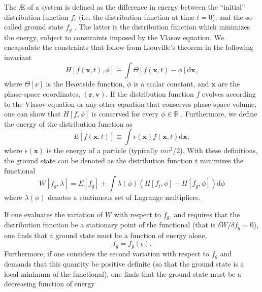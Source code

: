     \par
    The \AE{} of a system is defined as the difference in energy between the ``initial'' distribution function $f_i$ (i.e. the distribution function at time $t=0$), and the so-called ground state $f_g$ \citep{Lorenz1955AvailableCirculation,Gardner1963BoundPlasma}. The latter is the distribution function which minimizes the energy, subject to constraints imposed by the Vlasov equation. We encapsulate the constraints that follow from Liouville's theorem in the following invariant
    \begin{equation}
    H[f(\boldsymbol{x},t),\phi] \equiv \int \Theta[f(\boldsymbol{x},t)-\phi] \mathrm{d} \boldsymbol{x},
    \label{eq:vlasov-invariant}
    \end{equation}
    where $\Theta[x]$ is the Heaviside function, $\phi$ is a scalar constant, and $\boldsymbol{x}$ are the phase-space coordinates, $(\boldsymbol{r},\boldsymbol{v})$. If the distribution function $f$ evolves according to the Vlasov equation or any other equation that conserves phase-space volume, one can show that $H[f,\phi]$ is conserved for every $\phi \in \mathbb{R}$ \citep{Helander2017AvailablePlasmas}. Furthermore, we define the energy of the distribution function as
    \begin{equation}
        E[f(\boldsymbol{x},t)] \equiv \int \epsilon (\boldsymbol{x}) f(\boldsymbol{x},t) \mathrm{d} \boldsymbol{x},
    \label{eq:energy-functional}
    \end{equation}
    where $\epsilon(\boldsymbol{x})$ is the energy of a particle (typically $mv^2/2$). With these definitions, the ground state can be denoted as the distribution function t minimizes the functional
    \begin{equation}
        W[f_g,\lambda] = E[f_g] + \int \lambda(\phi) \left( H[f_i,\phi] - H[f_g,\phi] \right) \mathrm{d}\phi
    \end{equation}
    where $\lambda(\phi)$ denotes a continuous set of Lagrange multipliers. \par
    If one evaluates the variation of $W$ with respect to $f_g$, and requires that the distribution function be a stationary point of the functional (that is $\delta W/\delta f_g=0$), one finds that a ground state must be a function of energy alone,
    \begin{equation}
        f_g = f_g(\epsilon).
        \label{eq:ground-state-dependencies}
    \end{equation}
    Furthermore, if one considers the second variation with respect to $f_g$ and demands that this quantity be positive definite (so that the ground state is a local minimum of the functional), one finds that the ground state must be a decreasing function of energy
